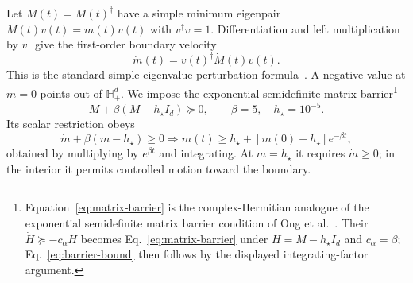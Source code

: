 \documentclass[10pt,twocolumn]{article}
\newcommand{\I}{I}
\begin{document}
Let $M(t)=M(t)^\dagger$ have a simple minimum eigenpair
$M(t)v(t)=m(t)v(t)$ with $v^\dagger v=1$.  Differentiation and left
multiplication by $v^\dagger$ give the first-order boundary velocity
\begin{equation}
\dot m(t)=v(t)^\dagger\dot M(t)v(t).
\label{eq:eigenvalue-velocity}
\end{equation}
This is the standard simple-eigenvalue perturbation formula~\cite{kato1966}.
A negative value at $m=0$ points out of $\mathbb H_+^d$.  We impose
the exponential semidefinite matrix barrier\footnote{Equation~\eqref{eq:matrix-barrier}
is the complex-Hermitian analogue of the exponential semidefinite matrix
barrier condition of Ong et al.~\cite[Proposition~1]{ong2025}.  Their
$\dot H\succeq-c_\alpha H$ becomes Eq.~\eqref{eq:matrix-barrier} under
$H=M-h_\star I_d$ and $c_\alpha=\beta$; Eq.~\eqref{eq:barrier-bound} then
follows by the displayed integrating-factor argument.}
\begin{equation}
\dot M+\beta(M-h_\star\I_d)\succeq0,
\qquad \beta=5,\quad h_\star=10^{-5}.
\label{eq:matrix-barrier}
\end{equation}
Its scalar restriction obeys
\begin{equation}
\dot m+\beta(m-h_\star)\geq0
\Longrightarrow
m(t)\geq h_\star+[m(0)-h_\star]e^{-\beta t},
\label{eq:barrier-bound}
\end{equation}
obtained by multiplying by $e^{\beta t}$ and integrating.  At
$m=h_\star$ it requires $\dot m\geq0$; in the interior it permits controlled
motion toward the boundary.
\end{document}
